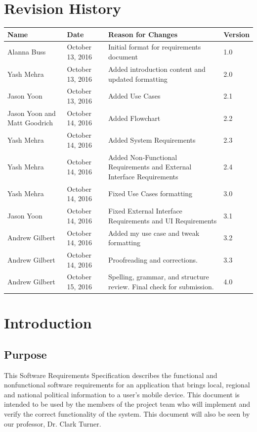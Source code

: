 \documentclass[12pt,oneside,letterpaper]{article}
\newcounter{use_case}
\newcounter{functional_requirement}
\begin{document}
\section*{Revision History}
\begin{tabu}{|X[L.5]|l|X|l|}
  \hline
  \textbf{Name}&\textbf{Date}&\textbf{Reason for Changes}&\textbf{Version} \\
  \hline
  Alanna Buss & October 13, 2016 & Initial format for requirements document & 1.0 \\
  \hline
  Yash Mehra & October 13, 2016 & Added introduction content and updated formatting & 2.0 \\
  \hline
  Jason Yoon & October 13, 2016 & Added Use Cases & 2.1 \\
  \hline
  Jason Yoon and Matt Goodrich & October 14, 2016 & Added Flowchart & 2.2 \\
  \hline
  Yash Mehra & October 14, 2016 & Added System Requirements & 2.3 \\
  \hline
  Yash Mehra & October 14, 2016 & Added Non-Functional Requirements and External Interface Requirements & 2.4 \\
  \hline
  Yash Mehra & October 14, 2016 & Fixed Use Cases formatting & 3.0 \\
  \hline
  Jason Yoon & October 14, 2016 & Fixed External Interface Requirements and UI Requirements& 3.1 \\
  \hline
  Andrew Gilbert & October 14, 2016 & Added my use case and tweak formatting & 3.2 \\
  \hline
  Andrew Gilbert & October 14, 2016 & Proofreading and corrections. & 3.3\\
  \hline
  Andrew Gilbert & October 15, 2016 & Spelling, grammar, and structure review. Final check for submission. & 4.0 \\
  \hline
\end{tabu}

\newpage

\section{Introduction}
\subsection{Purpose}
This Software Requirements Specification describes the functional and
nonfunctional software requirements for an application that brings
local, regional and national political information to a user's mobile
device.  This document is intended to be used by the members of the
project team who will implement and verify the correct functionality
of the system. This document will also be seen by our professor,
Dr. Clark Turner.
\end{document}
